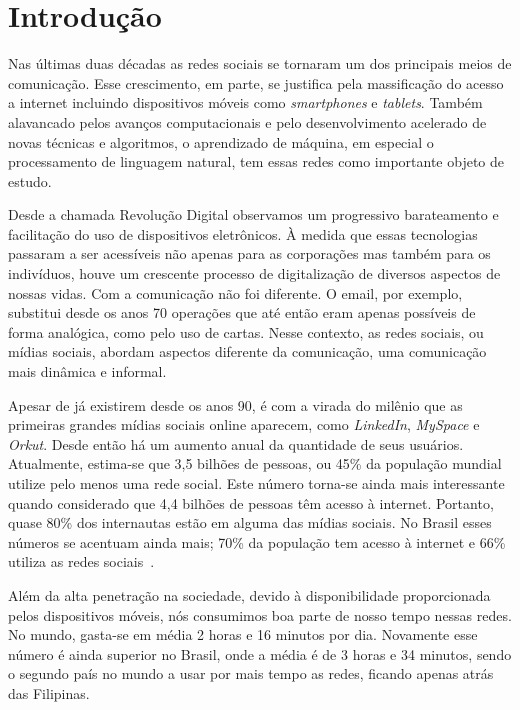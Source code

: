 \chapter{Introdução}

Nas últimas duas décadas as redes sociais se tornaram um dos principais meios de
comunicação.
Esse crescimento, em parte, se justifica pela massificação do acesso a internet
incluindo dispositivos móveis como \textit{smartphones} e \textit{tablets}.
Também alavancado pelos avanços computacionais e pelo desenvolvimento acelerado
de novas técnicas e algoritmos, o aprendizado de máquina, em especial o
processamento de linguagem natural, tem essas redes como importante objeto de
estudo.

Desde a chamada Revolução Digital observamos um progressivo barateamento e
facilitação do uso de dispositivos eletrônicos.
À medida que essas tecnologias passaram a ser acessíveis não apenas para as
corporações mas também para os indivíduos, houve um crescente processo de
digitalização de diversos aspectos de nossas vidas.
Com a comunicação não foi diferente.
O email, por exemplo, substitui desde os anos 70 operações que até então eram
apenas possíveis de forma analógica, como pelo uso de cartas.
Nesse contexto, as redes sociais, ou mídias sociais, abordam aspectos diferente
da comunicação, uma comunicação mais dinâmica e informal.

Apesar de já existirem desde os anos 90, é com a virada do milênio que as
primeiras grandes mídias sociais online aparecem, como \textit{LinkedIn},
\textit{MySpace} e \textit{Orkut}.
Desde então há um aumento anual da quantidade de seus usuários.
Atualmente, estima-se que 3,5 bilhões de pessoas, ou 45\% da população mundial
utilize pelo menos uma rede social.
Este número torna-se ainda mais interessante quando considerado que 4,4 bilhões
de pessoas têm acesso à internet.
Portanto, quase 80\% dos internautas estão em alguma das mídias sociais.
No Brasil esses números se acentuam ainda mais; 70\% da população tem
acesso à internet e 66\% utiliza as redes sociais~\cite{social19}.

Além da alta penetração na sociedade, devido à disponibilidade proporcionada
pelos dispositivos móveis,  nós consumimos boa parte de nosso tempo nessas redes.
No mundo, gasta-se em média 2 horas e 16 minutos por dia.
Novamente esse número é ainda superior no Brasil, onde a média é de 3 horas e
34 minutos, sendo o segundo país no mundo a usar por mais tempo as redes, ficando
apenas atrás das Filipinas.

